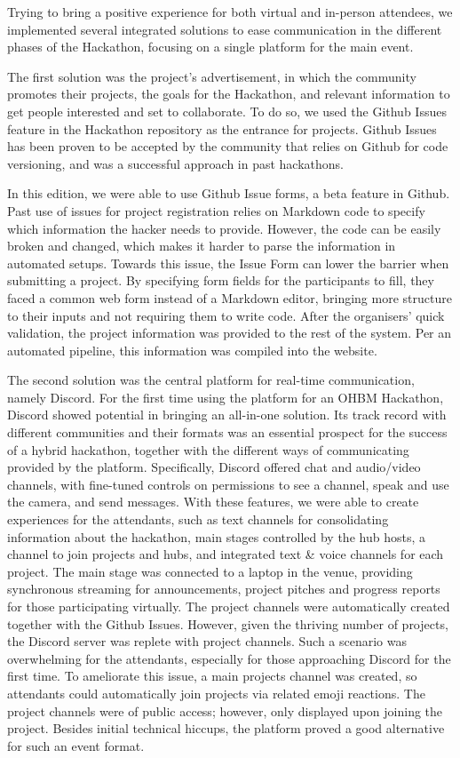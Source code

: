 \documentclass[12pt,a4paper,onecolumn]{article}
\begin{document}
Trying to bring a positive experience for both virtual and in-person
attendees, we implemented several integrated solutions to ease
communication in the different phases of the Hackathon, focusing on a
single platform for the main event.

The first solution was the project's advertisement, in which the
community promotes their projects, the goals for the Hackathon, and
relevant information to get people interested and set to collaborate. To
do so, we used the Github Issues feature in the Hackathon
repository as the entrance for projects. Github Issues has been proven
to be accepted by the community that relies on Github for code
versioning, and was a successful approach in past hackathons.

In this edition, we were able to use Github Issue forms, a beta feature
in Github. Past use of issues for project registration relies on
Markdown code to specify which information the hacker needs to provide.
However, the code can be easily broken and changed, which makes it
harder to parse the information in automated setups. Towards this issue,
the Issue Form can lower the barrier when submitting a project. By
specifying form fields for the participants to fill, they faced a common
web form instead of a Markdown editor, bringing more structure to their
inputs and not requiring them to write code. After the organisers' quick
validation, the project information was provided to the rest of the
system. Per an automated pipeline, this information was compiled into
the website.

The second solution was the central platform for real-time
communication, namely Discord. For the first time using the platform for
an OHBM Hackathon, Discord showed potential in bringing an all-in-one
solution. Its track record with different communities and their formats
was an essential prospect for the success of a hybrid hackathon,
together with the different ways of communicating provided by the
platform. Specifically, Discord offered chat and audio/video channels,
with fine-tuned controls on permissions to see a channel, speak and use
the camera, and send messages. With these features, we were able to
create experiences for the attendants, such as text channels for
consolidating information about the hackathon, main stages controlled by
the hub hosts, a channel to join projects and hubs, and integrated text
\& voice channels for each project. The main stage was connected to a
laptop in the venue, providing synchronous streaming for announcements,
project pitches and progress reports for those participating virtually.
The project channels were automatically created together with the Github
Issues. However, given the thriving number of projects, the Discord
server was replete with project channels. Such a scenario was
overwhelming for the attendants, especially for those approaching
Discord for the first time. To ameliorate this issue, a main projects
channel was created, so attendants could automatically join projects via
related emoji reactions. The project channels were of public access;
however, only displayed upon joining the project. Besides initial
technical hiccups, the platform proved a good alternative for such an
event format.
\end{document}
